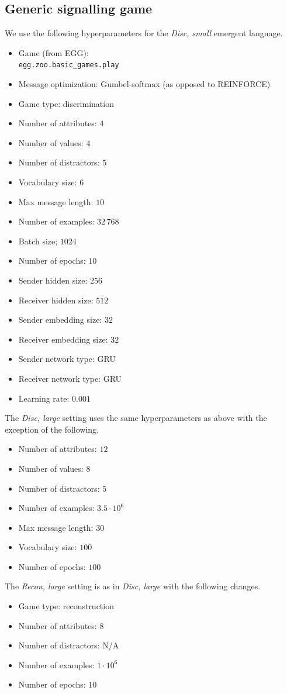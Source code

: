 \subsection{Generic signalling game}
\unskip\label{sec:hparams-egg}
We use the following hyperparameters for the \emph{Disc, small} emergent language.
\begin{itemize}[itemsep=-1.2ex]
  \item Game (from EGG): \\\texttt{egg.zoo.basic\_games.play}
  \item Message optimization: Gumbel-softmax (as opposed to REINFORCE)
  \item Game type: discrimination
  \item Number of attributes: $4$
  \item Number of values: $4$
  \item Number of distractors: $5$
  \item Vocabulary size: $6$
  \item Max message length: $10$
  \item Number of examples: $32\,768$
  \item Batch size; $1024$
  \item Number of epochs: $10$
  \item Sender hidden size: $256$
  \item Receiver hidden size: $512$
  \item Sender embedding size: $32$
  \item Receiver embedding size: $32$
  \item Sender network type: GRU
  \item Receiver network type: GRU
  \item Learning rate: $0.001$
\end{itemize}
The \emph{Disc, large} setting uses the same hyperparameters as above with the exception of the following.
\begin{itemize}[itemsep=-1.2ex]
  \item Number of attributes: $12$
  \item Number of values: $8$
  \item Number of distractors: $5$
  \item Number of examples: $3.5\cdot10^6$
  \item Max message length: $30$
  \item Vocabulary size: $100$
  \item Number of epochs: $100$
\end{itemize}
The \emph{Recon, large} setting is as in \emph{Disc, large} with the following changes.
\begin{itemize}[itemsep=-1.2ex]
  \item Game type: reconstruction
  \item Number of attributes: $8$
  \item Number of distractors: N/A
  \item Number of examples: $1\cdot10^6$
  \item Number of epochs: $10$
\end{itemize}


